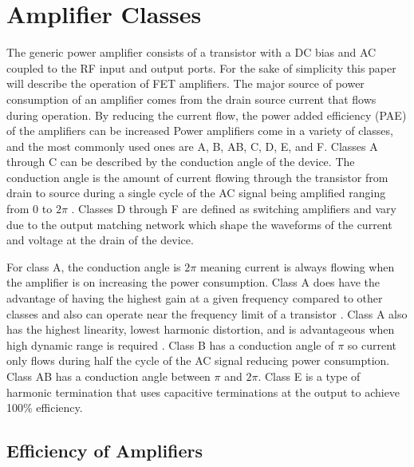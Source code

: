 \chapter{Amplifier Classes}
The generic power amplifier consists of a transistor with a DC bias and AC coupled to the RF input and output ports. For the sake of simplicity this paper will describe the operation of FET amplifiers. The major source of power consumption of an amplifier comes from the drain source current that flows during operation. By reducing the current flow, the power added efficiency (PAE) of the amplifiers can be increased
Power amplifiers come in a variety of classes, and the most commonly used ones are A, B, AB, C, D, E, and F. Classes A through C can be described by the conduction angle of the device. The conduction angle is the amount of current flowing through the transistor from drain to source during a single cycle of the AC signal being amplified ranging from 0 to $2\pi$ \cite{Colantonio1998}. Classes D through F are defined as switching amplifiers and vary due to the output matching network which shape the waveforms of the current and voltage at the drain of the device.

For class A, the conduction angle is $2\pi$ meaning current is always flowing when the amplifier is on increasing the power consumption. Class A does have the advantage of having the highest gain at a given frequency compared to other classes and also can operate near the frequency limit of a transistor .\cite{} Class A also has the highest linearity, lowest harmonic distortion, and is advantageous when high dynamic range is required .\cite{C.Cripps2006} Class B has a conduction angle of $\pi$ so current only flows during half the cycle of the AC signal reducing power consumption. Class AB has a conduction angle between $\pi$ and $2\pi$. Class E is a type of harmonic termination that uses capacitive terminations at the output to achieve 100\% efficiency.


\section{Efficiency of Amplifiers}


